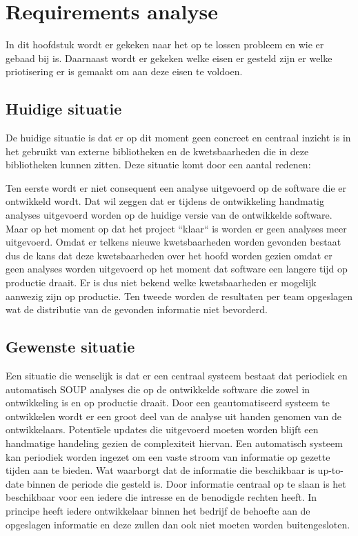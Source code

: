 \chapter{Requirements analyse}\label{ch:requirements-analyse}

In dit hoofdstuk wordt er gekeken naar het op te lossen probleem en wie er gebaad bij is. Daarnaast wordt er gekeken welke eisen er gesteld zijn er welke priotisering er is gemaakt om aan deze eisen te voldoen.


\section{Huidige situatie}\label{sec:huid-sit}
De huidige situatie is dat er op dit moment geen concreet en centraal inzicht is in het gebruikt van externe bibliotheken en de kwetsbaarheden die in deze bibliotheken kunnen zitten. Deze situatie komt door een aantal redenen:

Ten eerste wordt er niet consequent een analyse uitgevoerd op de software die er ontwikkeld wordt. Dat wil zeggen dat er tijdens de ontwikkeling handmatig analyses uitgevoerd worden op de huidige versie van de ontwikkelde software. Maar op het moment op dat het project ``klaar`` is worden er geen analyses meer uitgevoerd. Omdat er telkens nieuwe kwetsbaarheden worden gevonden bestaat dus de kans dat deze kwetsbaarheden over het hoofd worden gezien omdat er geen analyses worden uitgevoerd op het moment dat software een langere tijd op productie draait. Er is dus niet bekend welke kwetsbaarheden er mogelijk aanwezig zijn op productie.
Ten tweede worden de resultaten per team opgeslagen wat de distributie van de gevonden informatie niet bevorderd.


\section{Gewenste situatie}\label{sec:gewenste-situatie}
Een situatie die wenselijk is dat er een centraal systeem bestaat dat periodiek en automatisch SOUP analyses die op de ontwikkelde software die zowel in ontwikkeling is en op productie draait. Door een geautomatiseerd systeem te ontwikkelen wordt er een groot deel van de analyse uit handen genomen van de ontwikkelaars. Potentïele updates die uitgevoerd moeten worden blijft een handmatige handeling gezien de complexiteit hiervan. Een automatisch systeem kan periodiek worden ingezet om een vaste stroom van informatie op gezette tijden aan te bieden. Wat waarborgt dat de informatie die beschikbaar is up-to-date binnen de periode die gesteld is. Door informatie centraal op te slaan is het beschikbaar voor een iedere die intresse en de benodigde rechten heeft. In principe heeft iedere ontwikkelaar binnen het bedrijf de behoefte aan de opgeslagen informatie en deze zullen dan ook niet moeten worden buitengesloten.


